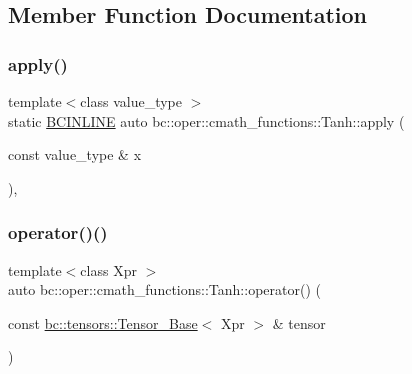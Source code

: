 \subsection{Member Function Documentation}
\mbox{\label{structbc_1_1oper_1_1cmath__functions_1_1Tanh_ab204c4a033f53f988ecab1ffee0b1c07}} 
\subsubsection{\texorpdfstring{apply()}{apply()}}
{\footnotesize\ttfamily template$<$class value\+\_\+type $>$ \\
static \hyperlink{common_8h_a6699e8b0449da5c0fafb878e59c1d4b1}{B\+C\+I\+N\+L\+I\+NE} auto bc\+::oper\+::cmath\+\_\+functions\+::\+Tanh\+::apply (\begin{DoxyParamCaption}\item[{const value\+\_\+type \&}]{x }\end{DoxyParamCaption})\hspace{0.3cm}{\ttfamily [inline]}, {\ttfamily [static]}}

\mbox{\label{structbc_1_1oper_1_1cmath__functions_1_1Tanh_abda6742289dbcd543d9a56e79c50d794}} 
\subsubsection{\texorpdfstring{operator()()}{operator()()}\hspace{0.1cm}{\footnotesize\ttfamily [1/3]}}
{\footnotesize\ttfamily template$<$class Xpr $>$ \\
auto bc\+::oper\+::cmath\+\_\+functions\+::\+Tanh\+::operator() (\begin{DoxyParamCaption}\item[{const \hyperlink{classbc_1_1tensors_1_1Tensor__Base}{bc\+::tensors\+::\+Tensor\+\_\+\+Base}$<$ Xpr $>$ \&}]{tensor }\end{DoxyParamCaption})\hspace{0.3cm}{\ttfamily [inline]}}

